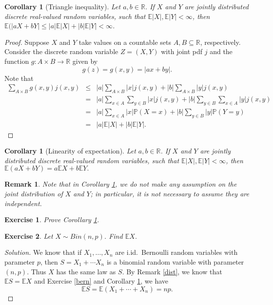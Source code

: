 \documentclass[12pt, reqno]{amsart}
\newtheorem{corollary}[theorem]{Corollary}
\newtheorem{remark}{Remark}
\newtheorem{ex}{Exercise}[section]
\renewcommand{\P}{{\mathbb P}}  %
\newcommand{\R}{{\mathbb R}}
\newcommand{\E}{{\mathbb E}}     %
\begin{document}
\begin{corollary}[Triangle inequality]
Let $a,b \in \R$.  If $X$ and $Y$ are jointly distributed discrete real-valued random variables, such that $\E |X|, \E |Y| < \infty$, then $\E(|aX + bY|\leq  |a| \E |X| + |b| \E |Y| < \infty$.
\end{corollary}
\begin{proof}  Suppose $X$ and $Y$ take values on a countable sets $A,B \subseteq \R$, respectively.    Consider the discrete random variable $Z = (X,Y)$ with joint pdf $j$ and the function $g: A \times B \to \R$ given by 
$$ g(z) = g(x,y) = |ax + by|.$$  Note that
\begin{eqnarray*}
\sum_{A \times B} g(x,y) j(x,y)    &\leq&   |a| \sum_{A \times B}|x| j(x,y) + |b| \sum_{A \times B}|y| j(x,y) \\
&=&   |a| \sum_{ x \in A}  \sum_{ y \in B} |x| j(x,y) + |b|  \sum_{y \in B} \sum_{x \in A}|y| j(x,y) \\
&=&  |a| \sum_{ x \in A} |x| \P(X =x)  +  |b| \sum_{y \in B} |y| \P(Y = y) \\
&=&  |a| \E|X| + |b| \E| Y|.
\end{eqnarray*}
\end{proof}

\begin{corollary}[Linearity of expectation]
\label{lin}
Let $a,b \in \R$.  If $X$ and $Y$ are jointly distributed discrete real-valued random variables, such that $\E |X|, \E |Y| < \infty$, then $\E(aX + bY) = a \E X + b \E Y.$
\end{corollary}


\begin{remark}
Note that in Corollary \ref{lin}, we do not make any assumption on the joint distribution of $X$ and $Y$; in particular, it is not necessary to assume they are independent. 
\end{remark}


\begin{ex}  Prove Corollary \ref{lin}.

\end{ex}


\begin{ex}
\label{bin}
  Let $X \sim Bin(n,p)$.  Find $\E X$.  

\end{ex}

\begin{proof}[Solution]
We know that if $X_1, \ldots, X_n$ are i.id.\ Bernoulli random variables with parameter $p$, then $S = X_1 + \cdots X_n$ is a binomial random variable with parameter $(n,p)$.   Thus $X$ has the same law as $S$.  By Remark \ref{dist}, we know that $\E S = \E X$ and Exercise \ref{bern} and Corollary \ref{lin}, we have
$$ \E S = \E(X_1 + \cdots + X_n) = np.$$
\end{proof}
\end{document}
